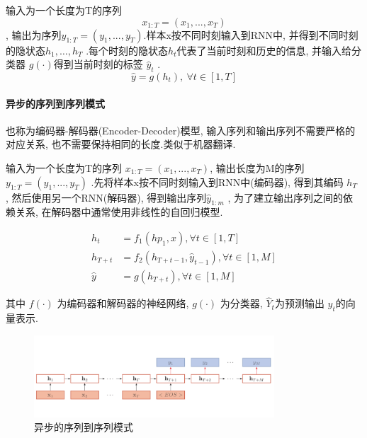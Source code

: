\documentclass[a4paper]{article}
\theoremstyle{definition}
\numberwithin{equation}{section}
\begin{document}
输入为一个长度为T的序列$$ x_{1:T}=(x_1, ...,  x_T)$$, 输出为序列$y_{1:T}=(y_1, ...,  y_T)$.样本x按不同时刻输入到RNN中, 并得到不同时刻的隐状态$h_1,  \dots,  h_T$ .每个时刻的隐状态$h_t$代表了当前时刻和历史的信息, 并输入给分类器 $g(\cdot)$得到当前时刻的标签 $ \hat{y}_t$ .
$$\hat{y}= g(h_t),  \  \forall t \in [1, T]$$



\paragraph{异步的序列到序列模式}
也称为编码器-解码器(Encoder-Decoder)模型, 输入序列和输出序列不需要严格的对应关系, 也不需要保持相同的长度.类似于机器翻译.

输入为一个长度为T的序列 $ x_{1:T}=(x_1, ...,  x_T)$, 输出长度为M的序列 $ y_{1:T}=(y_1, ...,  y_T)$ .先将样本x按不同时刻输入到RNN中(编码器), 得到其编码 $h_T$ , 然后使用另一个RNN(解码器), 得到输出序列$ \hat{y}_{1:m}$ , 为了建立输出序列之间的依赖关系, 在解码器中通常使用非线性的自回归模型.

\begin{equation}
    \begin{split}
        h_t &= f_1(hp_1, x),   \forall t \in [1, T] \\
    h_{T+t}& = f_2(h_{T+t-1}, \hat{y}_{t-1}),  \forall t\in[1, M]\\
    \hat{y}&= g(h_{T+t}),   \forall t\in[1, M]
    \end{split} 
\end{equation}

其中 $f(\cdot)$ 为编码器和解码器的神经网络,  $g(\cdot)$ 为分类器,  $\hat{Y}_t$为预测输出 $\hat{y}_t$的向量表示.
\begin{figure}[!htb]
    \center
\includegraphics[width=0.8\textwidth]{RNN_model3.png}
\caption{异步的序列到序列模式}
\end{figure}


\end{document}

